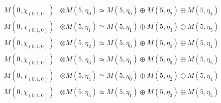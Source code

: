 \begin{align*}
M(0,\chi_{(0,1,0)}) &\otimes M(5,\eta_{0}) \simeq M(5,\eta_{0}) \oplus M(5,\eta_{2}) \oplus M(5,\eta_{4}) \\
M(0,\chi_{(0,1,0)}) &\otimes M(5,\eta_{1}) \simeq M(5,\eta_{1}) \oplus M(5,\eta_{3}) \oplus M(5,\eta_{5}) \\
M(0,\chi_{(0,1,0)}) &\otimes M(5,\eta_{2}) \simeq M(5,\eta_{0}) \oplus M(5,\eta_{2}) \oplus M(5,\eta_{4}) \\
M(0,\chi_{(0,1,0)}) &\otimes M(5,\eta_{3}) \simeq M(5,\eta_{1}) \oplus M(5,\eta_{3}) \oplus M(5,\eta_{5}) \\
M(0,\chi_{(0,1,0)}) &\otimes M(5,\eta_{4}) \simeq M(5,\eta_{0}) \oplus M(5,\eta_{2}) \oplus M(5,\eta_{4}) \\
M(0,\chi_{(0,1,0)}) &\otimes M(5,\eta_{5}) \simeq M(5,\eta_{1}) \oplus M(5,\eta_{3}) \oplus M(5,\eta_{5}) \\
\end{align*}

